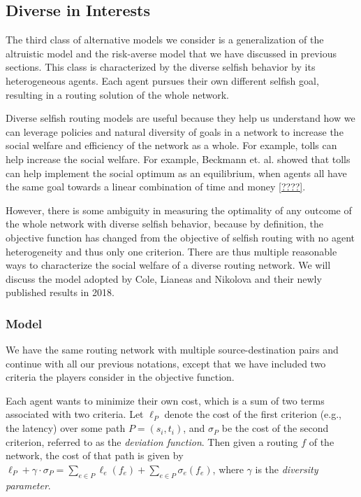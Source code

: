\subsection{Diverse in Interests}\label{sec:diversity}

The third class of alternative models we consider is a generalization of the altruistic model and the risk-averse model that we have discussed in previous sections. This class is characterized by the diverse selfish behavior by its heterogeneous agents. Each agent pursues their own different selfish goal, resulting in a routing solution of the whole network. 

Diverse selfish routing models are useful because they help us understand how we can leverage policies and natural diversity of goals in a network to increase the social welfare and efficiency of the network as a whole. For example, tolls can help increase the social welfare. For example, Beckmann et. al. showed that tolls can help implement the social optimum as an equilibrium, when agents all have the same goal towards a linear combination of time and money \ref{????}.

However, there is some ambiguity in measuring the optimality of any outcome of the whole network with diverse selfish behavior, because by definition, the objective function has changed from the objective of selfish routing with no agent heterogeneity and thus only one criterion. There are thus multiple reasonable ways to characterize the social welfare of a diverse routing network. We will discuss the model adopted by Cole, Lianeas and Nikolova and their newly published results in 2018.

\subsubsection{Model}

We have the same routing network with multiple source-destination pairs and continue with all our previous notations, except that we have included two criteria the players consider in the objective function.

Each agent wants to minimize their own cost, which is a sum of two terms associated with two criteria. Let $\ell_P$ denote the cost of the first criterion (e.g., the latency) over some path $P=(s_i, t_i)$, and $\sigma_P$ be the cost of the second criterion, referred to as the {\it deviation function}. Then given a routing $f$ of the network, the cost of that path is given by $\ell_P+\gamma\cdot \sigma_P=\sum_{e\in P} \ell_e(f_e)+ \sum_{e\in P}\sigma_e(f_e)$, where $\gamma$ is the {\it diversity parameter}.

